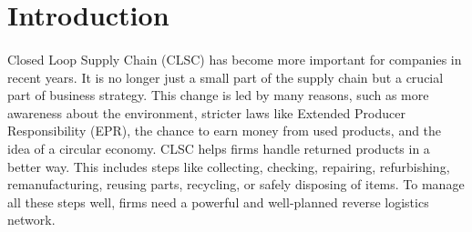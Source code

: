 \section{Introduction}

\paragraph{} Closed Loop Supply Chain (CLSC) has become more important for companies in recent years. It is no longer just a small part of the supply chain but a crucial part of business strategy. This change is led by many reasons, such as more awareness about the environment, stricter laws like Extended Producer Responsibility (EPR), the chance to earn money from used products, and the idea of a circular economy. CLSC helps firms handle returned products in a better way. This includes steps like collecting, checking, repairing, refurbishing, remanufacturing, reusing parts, recycling, or safely disposing of items. To manage all these steps well, firms need a powerful and well-planned reverse logistics network.

